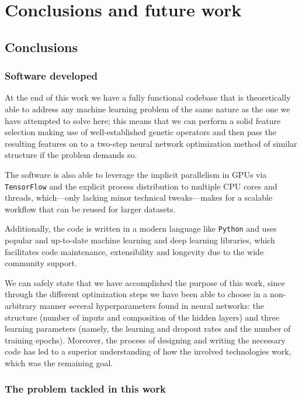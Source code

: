 \chapter{Conclusions and future work}\label{ch:conclusions}

\section{Conclusions}

	\subsection{Software developed}

		At the end of this work we have a fully functional codebase that is theoretically able to address any machine learning problem of the same nature as the one we have attempted to solve here; this means that we can perform a solid feature selection making use of well-established genetic operators and then pass the resulting features on to a two-step neural network optimization method of similar structure if the problem demands so.

		The software is also able to leverage the implicit parallelism in GPUs via \texttt{TensorFlow} and the explicit process distribution to multiple CPU cores and threads, which---only lacking minor technical tweaks---makes for a scalable workflow that can be reused for larger datasets.

		Additionally, the code is written in a modern language like \texttt{Python} and uses popular and up-to-date machine learning and deep learning libraries, which facilitates code maintenance, extensibility and longevity due to the wide community support.

		We can safely state that we have accomplished the purpose of this work, since through the different optimization steps we have been able to choose in a non-arbitrary manner several hyperparameters found in neural networks: the structure (number of inputs and composition of the hidden layers) and three learning parameters (namely, the learning and dropout rates and the number of training epochs). Moreover, the process of designing and writing the necessary code has led to a superior understanding of how the involved technologies work, which was the remaining goal.

	\subsection{The problem tackled in this work}

